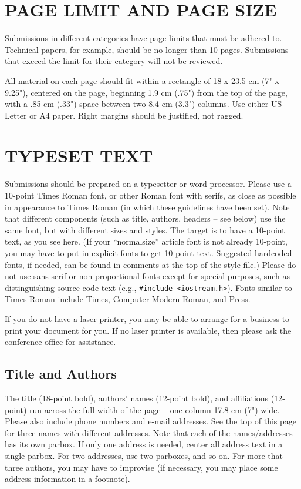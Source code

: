 \section{PAGE LIMIT AND PAGE SIZE}
Submissions in different categories have page 
limits that must be adhered to. Technical papers, for example, should 
be no longer than 10 pages. Submissions that exceed the 
limit for their category will not be reviewed.
 
All material on each page should fit within a rectangle of 
18 x 23.5 cm (7" x 9.25"), centered on the page, beginning 
1.9 cm (.75") from the top of the page, with a .85 cm (.33") 
space between two 8.4 cm (3.3") columns. Use either US 
Letter or A4 paper. Right margins should be justified, not 
ragged.

\section{TYPESET TEXT}
Submissions should be prepared on a typesetter or word 
processor. Please use a 10-point Times Roman font, or other 
Roman font with serifs, as close as possible in appearance to 
Times Roman (in which these guidelines have been set). Note 
that different components (such as title, authors, headers -- 
see below) use the same font, but with different sizes and 
styles. The target is to have a 10-point text, as you see here.
(If your ``normalsize'' article font is not already 10-point, you may
have to put in explicit fonts to get 10-point text.  Suggested
hardcoded fonts, if needed, can be found in comments
at the top of the style file.)
Please do not use sans-serif or non-proportional fonts except 
for special purposes, such as distinguishing source code text 
(e.g., \verb|#include <iostream.h>|). Fonts similar to Times 
Roman include Times, Computer Modern Roman, and Press.
 
If you do not have a laser printer, you may be able to arrange 
for a business to print your document for you. If no laser 
printer is available, then please ask the conference office for 
assistance. 

\subsection{Title and Authors}
The title (18-point bold), authors' names (12-point bold), 
and affiliations (12-point) run across the full width of the 
page -- one column 17.8 cm (7") wide. Please also include 
phone numbers and e-mail addresses. See the top of this 
page for three names with different addresses. Note that each 
of the names/addresses has its own parbox.
If only one address is needed, center all 
address text in a single parbox. For two addresses, use 
two parboxes, and so on. For more that three authors, you 
may have to improvise (if necessary, you may place some 
address information in a footnote). 

